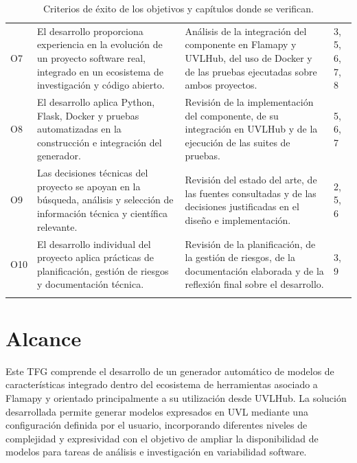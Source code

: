 \begin{longtable}{@{}P{1cm} P{6.2cm} P{4.6cm} P{1.7cm}@{}}
  O7 & El desarrollo proporciona experiencia en la evolución de un proyecto
  software real, integrado en un ecosistema de investigación y código abierto.
  & Análisis de la integración del componente en Flamapy y UVLHub, del uso de
  Docker y de las pruebas ejecutadas sobre ambos proyectos. & 3, 5, 6, 7, 8
  \\[0.3em]

  O8 & El desarrollo aplica Python, Flask, Docker y pruebas automatizadas en la
  construcción e integración del generador. & Revisión de la implementación del
  componente, de su integración en UVLHub y de la ejecución de las suites de
  pruebas. & 5, 6, 7 \\[0.3em]

  O9 & Las decisiones técnicas del proyecto se apoyan en la búsqueda, análisis
  y selección de información técnica y científica relevante. & Revisión del
  estado del arte, de las fuentes consultadas y de las decisiones justificadas
  en el diseño e implementación. & 2, 5, 6 \\[0.3em]

  O10 & El desarrollo individual del proyecto aplica prácticas de planificación,
  gestión de riesgos y documentación técnica. & Revisión de la planificación,
  de la gestión de riesgos, de la documentación elaborada y de la reflexión
  final sobre el desarrollo. & 3, 9 \\[0.3em]
  \bottomrule
  \caption{Criterios de éxito de los objetivos y capítulos donde se verifican.}
  \label{tab:criterios-exito}
\end{longtable}

\section{Alcance}
\label{sec:alcance}



Este TFG comprende el desarrollo de un generador automático de modelos de características integrado dentro del ecosistema de herramientas asociado a Flamapy y orientado principalmente a su utilización desde UVLHub. La solución desarrollada permite generar modelos expresados en UVL mediante una configuración definida por el usuario, incorporando diferentes niveles de complejidad y expresividad con el objetivo de ampliar la disponibilidad de modelos para tareas de análisis e investigación en variabilidad software.

